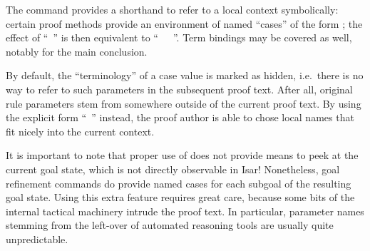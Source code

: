 \begin{isabellebody}
\begin{isamarkuptext}
  The \hyperlink{command.case}{\mbox{}} command provides a shorthand to refer to a
  local context symbolically: certain proof methods provide an
  environment of named ``cases'' of the form ; the effect of ``\hyperlink{command.case}{\mbox{}}~'' is then equivalent to ``\hyperlink{command.fix}{\mbox{}}~~\hyperlink{command.assume}{\mbox{}}~''.  Term bindings may be covered as well, notably
  \hyperlink{variable.?case}{\mbox{}} for the main conclusion.

  By default, the ``terminology''  of
  a case value is marked as hidden, i.e.\ there is no way to refer to
  such parameters in the subsequent proof text.  After all, original
  rule parameters stem from somewhere outside of the current proof
  text.  By using the explicit form ``\hyperlink{command.case}{\mbox{}}~'' instead, the proof author is able to
  chose local names that fit nicely into the current context.

  \medskip It is important to note that proper use of \hyperlink{command.case}{\mbox{}} does not provide means to peek at the current goal state,
  which is not directly observable in Isar!  Nonetheless, goal
  refinement commands do provide named cases 
  for each subgoal  of the resulting goal state.
  Using this extra feature requires great care, because some bits of
  the internal tactical machinery intrude the proof text.  In
  particular, parameter names stemming from the left-over of automated
  reasoning tools are usually quite unpredictable.


\end{isamarkuptext}
\end{isabellebody}
